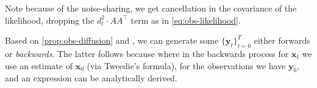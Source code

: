 Note because of the noise-sharing, we get cancellation in the covariance of the likelihood, dropping
the $d_t^2\cdot AA^\top$ term as in \autoref{eq:obs-likelihood}.

Based on \autoref{prop:obs-diffusion} and \textcite[Remark B.1]{douDiffusionPosteriorSampling2023},
we can generate some $\{\mathbf{y}_t\}_{t=0}^T$ either forwards or \emph{backwards}.
The latter follows because where in the backwards process for $\mathbf{x}_t$ we use an estimate of
$\mathbf{x}_0$ (via Tweedie's formula), for the observations we have $\mathbf{y}_0$, and an
expression can be analytically derived.
